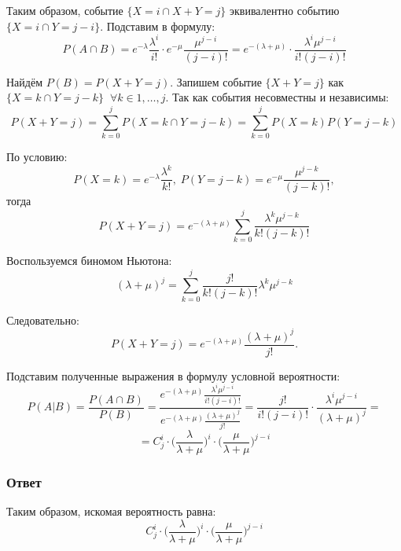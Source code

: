 \documentclass[a4paper,14pt]{extarticle}
\begin{document}
            Таким образом, событие \(\{X = i \cap X + Y = j\}\) эквивалентно событию \(\{X = i \cap Y = j - i\}\). Подставим в формулу:
            \[P(A \cap B ) =  e^{-\lambda} \frac{\lambda^i}{i!} \cdot e^{-\mu} \frac{\mu^{j-i}}{(j-i)!} = e^{-(\lambda + \mu)} \cdot \frac{\lambda^i \mu^{j-i}}{i!(j-i)!}\]
            
            Найдём \(P(B) = P(X + Y = j) \). Запишем событие \(\{X + Y = j\}\) как \(\{X = k \cap Y = j-k\} \;\; \forall k \in {1, \dots, j}\). Так как события несовместны и независимы:
            \[ P(X + Y = j) = \sum_{k=0}^{j} P(X = k \cap Y = j-k) = \sum_{k=0}^{j}P(X = k) P(Y = j - k)\]
            
            По условию:
            \[P(X = k) = e^{-\lambda} \frac{\lambda^k}{k!}, \; P(Y = j - k) = e^{-\mu} \frac{\mu^{j-k}}{(j-k)!}, \]
            тогда
            \[ P(X + Y = j) = e^{-(\lambda + \mu)} \sum_{k=0}^{j} \frac{\lambda^k \mu^{j-k}}{k!(j-k)!} \]
            
            Воспользуемся биномом Ньютона: \[(\lambda + \mu)^j = \sum_{k=0}^{j} \frac{j!}{k!(j-k)!} \lambda^k \mu^{j-k}\]
            
            Следовательно:
            \[P(X+Y=j) = e^{-(\lambda + \mu)} \frac{(\lambda+\mu)^j}{j!}.\]
            
            Подставим полученные выражения в формулу условной вероятности:
            \[P(A|B) = \frac{P( A \cap B)}{P(B)} = \frac{e^{-(\lambda + \mu)} \frac{\lambda^i \mu^{j-i}}{i!(j-i)!}}{e^{-(\lambda + \mu)} \frac{(\lambda+\mu)^j}{j!}} = \frac{j!}{i!(j-i)!} \cdot \frac{\lambda^i \mu^{j-i}}{(\lambda+\mu)^j} =\]
            \[ = C_j^i \cdot \big(\frac{\lambda}{\lambda+\mu}\big)^i \cdot \big(\frac{\mu}{\lambda+\mu}\big)^{j-i}\]
            
            \subsubsection*{Ответ}
                
                Таким образом, искомая вероятность равна:
                \[
                    \boxed{C_j^i \cdot \big(\frac{\lambda}{\lambda+\mu}\big)^i \cdot \big(\frac{\mu}{\lambda+\mu}\big)^{j-i}}
                \]


                
    
\end{document}
